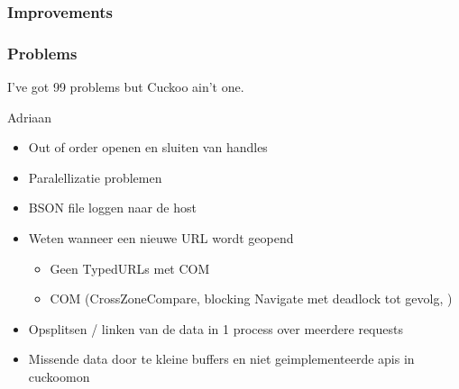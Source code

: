 \subsubsection{Improvements}




\subsubsection{Problems}
\label{99problems}
\epigraph{I've got 99 problems but Cuckoo ain't one.}{Adriaan}

\begin{itemize}
\item Out of order openen en sluiten van handles 
\item Paralellizatie problemen
\item BSON file loggen naar de host
\item Weten wanneer een nieuwe URL wordt geopend
\begin{itemize}
\item Geen TypedURLs met COM
\item COM (CrossZoneCompare, blocking Navigate met deadlock tot gevolg, )
\end{itemize}
\item Opsplitsen / linken van de data in 1 process over meerdere requests
\item Missende data door te kleine buffers en niet geimplementeerde apis in cuckoomon
\end{itemize}
